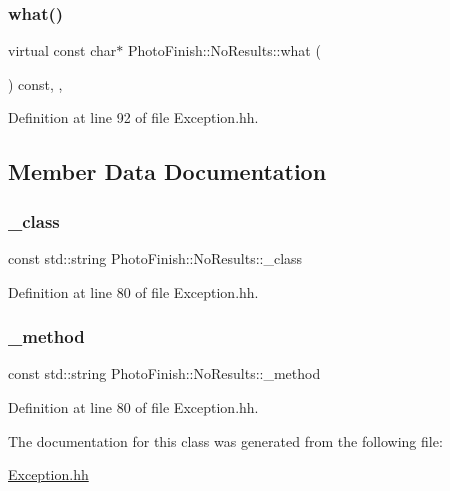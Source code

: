 \subsubsection{\texorpdfstring{what()}{what()}}
{\footnotesize\ttfamily virtual const char$\ast$ Photo\+Finish\+::\+No\+Results\+::what (\begin{DoxyParamCaption}{ }\end{DoxyParamCaption}) const\hspace{0.3cm}{\ttfamily [inline]}, {\ttfamily [virtual]}, {\ttfamily [noexcept]}}



Definition at line 92 of file Exception.\+hh.



\subsection{Member Data Documentation}
\mbox{\label{class_photo_finish_1_1_no_results_aff976ddae0700b53d38853d317ad4625}} 
\subsubsection{\texorpdfstring{\+\_\+class}{\_class}}
{\footnotesize\ttfamily const std\+::string Photo\+Finish\+::\+No\+Results\+::\+\_\+class\hspace{0.3cm}{\ttfamily [protected]}}



Definition at line 80 of file Exception.\+hh.

\mbox{\label{class_photo_finish_1_1_no_results_a40b03fc0845bb24d48f3c262cac6db25}} 
\subsubsection{\texorpdfstring{\+\_\+method}{\_method}}
{\footnotesize\ttfamily const std\+::string Photo\+Finish\+::\+No\+Results\+::\+\_\+method\hspace{0.3cm}{\ttfamily [protected]}}



Definition at line 80 of file Exception.\+hh.



The documentation for this class was generated from the following file\+:\begin{DoxyCompactItemize}
\item 
\hyperlink{_exception_8hh}{Exception.\+hh}\end{DoxyCompactItemize}

